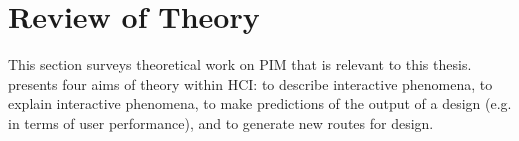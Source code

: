 \newpage
\section{Review of Theory}
\label{review:pim-theory-review}
This section surveys theoretical work on PIM that is relevant to this thesis.  \citet{rogers:04} presents four aims of theory within HCI: to describe interactive phenomena, to explain interactive phenomena, to make predictions of the output of a design (e.g. in terms of user performance), and to generate new routes for design.

